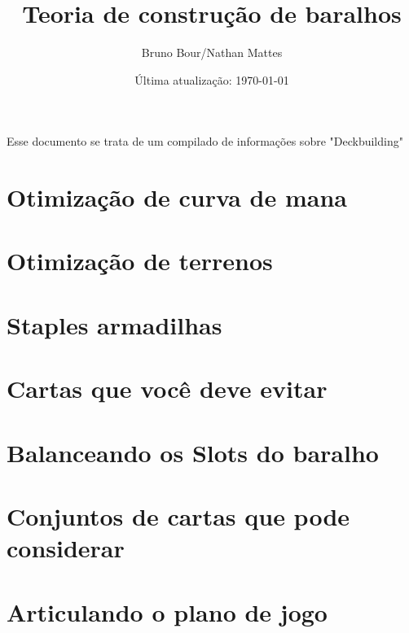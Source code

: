 \documentclass[12pt, a4paper]{article}
\begin{document}
\bgroup\obeylines

\title{Teoria de construção de baralhos}
\author{Bruno Bour/Nathan Mattes}
\date{Última atualização: \today}
    \maketitle

    \tableofcontents
 
    Esse documento se trata de um compilado de informações sobre "Deckbuilding"
    


    \section{Otimização de curva de mana}
    

    \section{Otimização de terrenos}
    

    \section{Staples armadilhas}
    

    \section{Cartas que você deve evitar}
    

    \section{Balanceando os Slots do baralho}
    

    \section{Conjuntos de cartas que pode considerar}
    

    \section{Articulando o plano de jogo}
    
\end{document}
